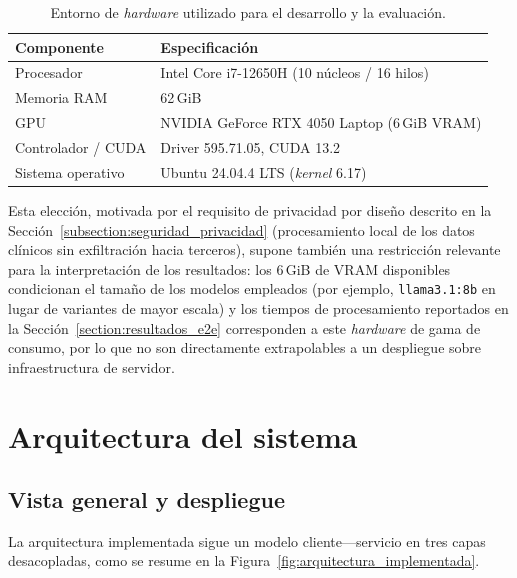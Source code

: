 \begin{table}[h!]
\centering
\begin{tabular}{ll}
\hline
\textbf{Componente} & \textbf{Especificación} \\
\hline
Procesador & Intel Core i7-12650H (10 núcleos / 16 hilos) \\
Memoria RAM & 62\,GiB \\
GPU & NVIDIA GeForce RTX 4050 Laptop (6\,GiB VRAM) \\
Controlador / CUDA & Driver 595.71.05, CUDA 13.2 \\
Sistema operativo & Ubuntu 24.04.4 LTS (\textit{kernel} 6.17) \\
\hline
\end{tabular}
\caption{Entorno de \textit{hardware} utilizado para el desarrollo y la evaluación.}
\label{tab:entorno_hardware}
\end{table}

Esta elección, motivada por el requisito de privacidad por diseño descrito en la
Sección~\ref{subsection:seguridad_privacidad} (procesamiento local de los datos clínicos sin
exfiltración hacia terceros), supone también una restricción relevante para la interpretación de los
resultados: los 6\,GiB de VRAM disponibles condicionan el tamaño de los modelos empleados (por
ejemplo, \texttt{llama3.1:8b} en lugar de variantes de mayor escala) y los tiempos de procesamiento
reportados en la Sección~\ref{section:resultados_e2e} corresponden a este \textit{hardware} de gama
de consumo, por lo que no son directamente extrapolables a un despliegue sobre infraestructura
 de servidor.

\section{Arquitectura del sistema}\label{section:arquitectura_sistema}

\subsection{Vista general y despliegue}\label{subsection:vista_general}

La arquitectura implementada sigue un modelo cliente----servicio en tres capas
desacopladas, como se resume en la Figura~\ref{fig:arquitectura_implementada}.




